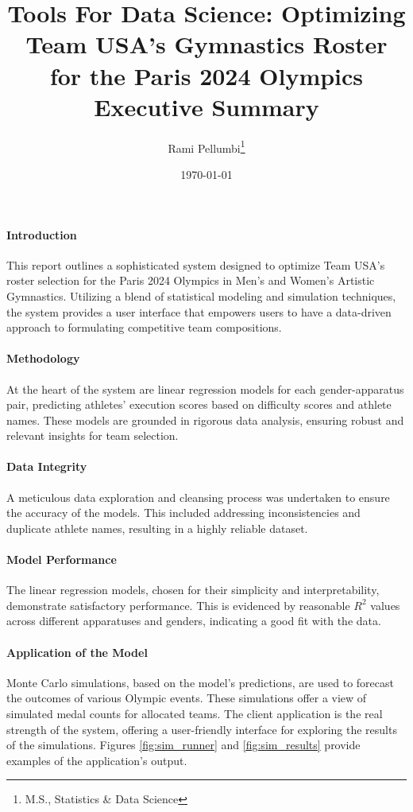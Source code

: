 \documentclass{article}
\title{Tools For Data Science: Optimizing Team USA's Gymnastics Roster for the Paris 2024 Olympics \\ \textbf{Executive Summary}}
\author{Rami Pellumbi\thanks{M.S., Statistics \& Data Science}}
\date{\today}
\begin{document}
\maketitle
\newpage
\paragraph{Introduction} This report outlines a sophisticated system designed to optimize Team USA's roster selection for the Paris 2024 Olympics in Men's and Women's Artistic Gymnastics. Utilizing a blend of statistical modeling and simulation techniques, the system provides a user interface that empowers users to have a data-driven approach to formulating competitive team compositions.

\paragraph{Methodology}
At the heart of the system are linear regression models for each gender-apparatus pair, predicting athletes' execution scores based on difficulty scores and athlete names. These models are grounded in rigorous data analysis, ensuring robust and relevant insights for team selection.

\paragraph{Data Integrity} A meticulous data exploration and cleansing process was undertaken to ensure the accuracy of the models. This included addressing inconsistencies and duplicate athlete names, resulting in a highly reliable dataset.

\paragraph{Model Performance} The linear regression models, chosen for their simplicity and interpretability, demonstrate satisfactory performance. This is evidenced by reasonable 
$R^2$ values across different apparatuses and genders, indicating a good fit with the data.

\paragraph{Application of the Model}
Monte Carlo simulations, based on the model's predictions, are used to forecast the outcomes of various Olympic events. 
These simulations offer a view of simulated medal counts for allocated teams. The 
client application is the real strength of the system, offering a user-friendly
interface for exploring the results of the simulations. Figures \ref{fig:sim_runner} and \ref{fig:sim_results} provide
examples of the application's output.
\end{document}
